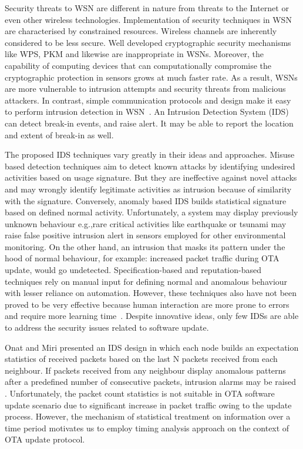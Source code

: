 \documentclass{CRPITStyle}
\renewcommand{\cite}{\citep}
\begin{document}
Security threats to WSN are different in nature from threats to the Internet or even other wireless technologies. %
Implementation of security techniques in WSN are characterised by constrained resources.
Wireless channels are inherently considered to be less secure.
Well developed cryptographic security mechanisms like WPS, PKM and likewise are inappropriate in WSNs.
Moreover, the capability of computing devices that can computationally compromise the cryptographic protection in sensors grows at much faster rate.
As a result, WSNs are more vulnerable to intrusion attempts and security threats from malicious attackers.
In contrast, simple communication protocols and design make it easy to perform intrusion detection in WSN~\cite{quing09}.
An Intrusion Detection System (IDS) can detect  break-in events, and raise alert. %
It may be able to report the location and extent of break-in as well.


The proposed IDS techniques vary greatly in their ideas and approaches.
Misuse based  detection  techniques aim to detect known attacks by identifying undesired activities based on usage signature.
But they are ineffective against novel attacks and 
may wrongly identify legitimate activities as intrusion because of similarity with the signature.
Conversely, anomaly based IDS builds statistical signature based on defined normal activity.
Unfortunately, a system may display previously unknown behaviour e.g.,rare critical activities like earthquake or tsunami may raise false positive intrusion alert in sensors employed for other environmental monitoring.
On the other hand, an intrusion that masks its pattern under the hood of normal behaviour, for example: increased packet traffic during OTA update, would go undetected.
Specification-based and reputation-based techniques rely on manual input for defining normal and anomalous behaviour with lesser reliance on automation.
However, these techniques also have not been proved to be very effective because human interaction are more prone to errors and require more learning time~\cite{quing09, 1593102, 1290173, Chen:2009:NMI:1516241.1516282}. 
Despite innovative ideas, only few IDSs are able to address the security issues related to software update.

Onat and Miri presented an IDS design in which each node builds an expectation statistics of received packets based on the last N packets received from each neighbour.
If packets received from any neighbour display anomalous patterns after a predefined number of consecutive packets, intrusion alarms may be raised \cite{1512911}.
Unfortunately, the  packet count statistics is not suitable in OTA software update scenario due to significant increase in packet traffic owing to the update process. 
However, the mechanism of statistical treatment on information over a time period motivates us to employ timing analysis approach on the context of OTA update protocol.
\end{document}
